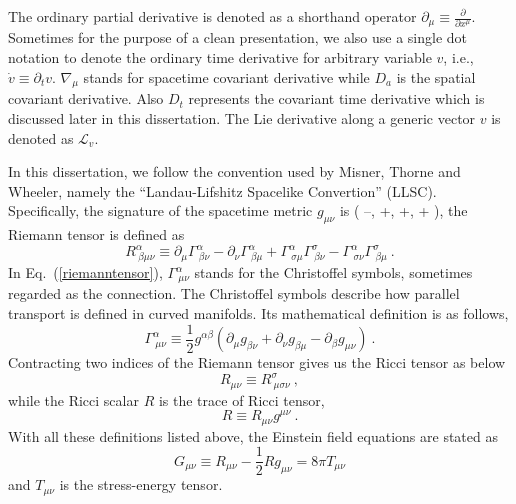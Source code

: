 The ordinary partial derivative is denoted as a shorthand operator $
\partial_{\mu} \equiv \frac{\partial}{\partial x^{\mu}}$. Sometimes for the purpose of a clean presentation, we also use a single dot notation to denote the ordinary time derivative for arbitrary variable $v$, i.e., ${\dot v} \equiv \partial_{t}v$. $\nabla_{\mu}$ stands for spacetime covariant derivative while $D_{a}$ is the spatial covariant derivative. Also $D_{t}$ represents the covariant time derivative which is discussed later in this dissertation. The Lie derivative along a generic vector $v$ is denoted as $\mathcal{L}_{v}$. 

In this dissertation, we follow the convention used by Misner, Thorne and Wheeler\cite{Misner:1974qy}, namely the ``Landau-Lifshitz Spacelike Convertion'' (LLSC). Specifically, the signature of the spacetime metric $g_{\mu\nu}$ is ( --, +, +, + ), the Riemann tensor is defined as 
\begin{equation}\label{riemanntensor}
	R^{\alpha}_{~\beta \mu \nu} \equiv 
	\partial_{\mu}\Gamma^{\alpha}_{~\beta \nu} - 
	\partial_{\nu}\Gamma^{\alpha}_{~\beta \mu} + \Gamma^{\alpha}_{~\sigma \mu}\Gamma^{\sigma}_{~\beta \nu} - \Gamma^{\alpha}_{~\sigma \nu}\Gamma^{\sigma}_{~\beta\mu} \ .
\end{equation}
In Eq.~(\ref{riemanntensor}), $\Gamma^{\alpha}_{~\mu\nu}$ stands for the Christoffel symbols, sometimes regarded as the connection. The Christoffel symbols describe how parallel transport is defined in curved manifolds. Its mathematical definition is as follows, 
\begin{equation}
	\Gamma^{\alpha}_{~\mu\nu} \equiv \frac{1}{2}g^{\alpha\beta}\left(\partial_{\mu}g_{\beta\nu} + \partial_{\nu}g_{\beta\mu} - \partial_{\beta}g_{\mu\nu}\right) \ .
\end{equation}
Contracting two indices of the Riemann tensor gives us the Ricci tensor as below
\begin{equation}
	R_{\mu\nu} \equiv R^{\sigma}_{~\mu\sigma\nu} \ ,  
\end{equation}
while the Ricci scalar $R$ is the trace of Ricci tensor, 
\begin{equation}
	R \equiv R_{\mu\nu}g^{\mu\nu}\ .
\end{equation}
With all these definitions listed above, the Einstein field equations are stated as 
\begin{equation}
	G_{\mu\nu} \equiv R_{\mu\nu} - \frac{1}{2} R g_{\mu\nu} = 8\pi T_{\mu\nu} 
\end{equation}
and $T_{\mu\nu}$ is the stress-energy tensor. 

